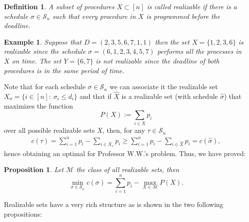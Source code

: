 \documentclass[12pt]{amsart}
\newtheorem{definition}{Definition}
\newtheorem{propo}[lemma]{Proposition}
\newtheorem{example}[lemma]{Example}
\numberwithin{equation}{section}
\begin{document}
\begin{definition}
A subset of procedures $X\subset[n]$ is called \textit{realizable} if there is a schedule $\sigma\in\mathcal{S}_n $ such that every procedure in $X$ is programmed before the deadline.  
\end{definition}
\begin{example}
Suppose that $D=(2,3,5,6,7,1,1)$ then the set $X=\{1,2,3,6\}$ is realizable since the schedule $\sigma=(6,1,2,3,4,5,7)$ performs all the processes in $X$ on time. The set $Y=\{6,7\}$ is not realizable since the deadline of both procedures is in the same period of time. 
\end{example}
Note that for each schedule $\sigma\in \mathcal{S}_n$ we can associate it the realizable set $X_{\sigma}=\{i\in[n]: \ \sigma_i\leq d_i\}$ and that if $\hat{X}$ is a realizable set (with schedule $\hat{\sigma}$) that maximizes the function
$$
P(X):=\sum_{i\in X}p_i
$$ 
over all possible realizable sets $X$, then, for any $\tau\in \mathcal{S}_n$ 
\begin{align*}
c(\tau)=\sum_{i=1}^np_i-\sum_{i\in X_\tau}p_i \geq \sum_{i=1}^np_i-\sum_{i\in \hat{X}}p_i=c(\hat{\sigma}), 
\end{align*} 
hence obtaining an optimal for Professor W.W.'s problem. Thus, we have proved:
\begin{propo}
Let $\mathcal{M}$ the class of all realizable sets, then
$$
\min_{\sigma\in \mathcal{S}_n}c(\sigma)=\sum_{i=1}^np_i-\max_{X\in \mathcal{M}}P(X).
$$ 
\end{propo}

Realizable sets have a very rich structure as is shown in the two following propositions:
\end{document}
